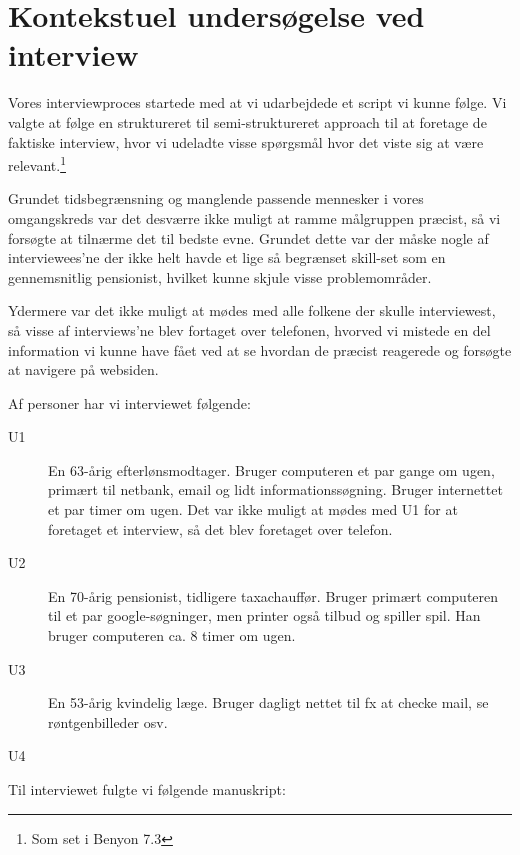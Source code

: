 \section{Kontekstuel undersøgelse ved interview}

Vores interviewproces startede med at vi udarbejdede et script vi kunne følge. Vi valgte at følge en struktureret til semi-struktureret approach til at foretage de faktiske interview, hvor vi udeladte visse spørgsmål hvor det viste sig at være relevant.\footnote{Som set i Benyon 7.3}

Grundet tidsbegrænsning og manglende passende mennesker i vores omgangskreds var det desværre ikke muligt at ramme målgruppen præcist, så vi forsøgte at tilnærme det til bedste evne. Grundet dette var der måske nogle af interviewees'ne der ikke helt havde et lige så begrænset skill-set som en gennemsnitlig pensionist, hvilket kunne skjule visse problemområder.

Ydermere var det ikke muligt at mødes med alle folkene der skulle interviewest, så visse af interviews'ne blev fortaget over telefonen, hvorved vi mistede en del information vi kunne have fået ved at se hvordan de præcist reagerede og forsøgte at navigere på websiden.

Af personer har vi interviewet følgende:

\begin{description}
    \item[U1] {
        En 63-årig efterlønsmodtager. Bruger computeren et par gange om ugen, primært til netbank, email og lidt informationssøgning. Bruger internettet et par timer om ugen. Det var ikke muligt at mødes med U1 for at foretaget et interview, så det blev foretaget over telefon.
    }
    \item[U2] {
        En 70-årig pensionist, tidligere taxachauffør. Bruger primært computeren til et par google-søgninger, men printer også tilbud og spiller spil. Han bruger computeren ca. 8 timer om ugen.
    }
    \item[U3] {
    En 53-årig kvindelig læge. Bruger dagligt nettet til fx at checke mail, se røntgenbilleder osv.
    }
    \item[U4] {
    }
\end{description}

Til interviewet fulgte vi følgende manuskript:

